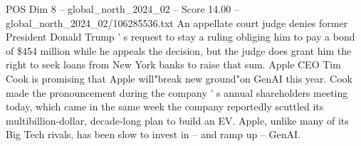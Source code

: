 \begin{textsample}{POS Dim 8 – global\_north\_2024\_02 – Score 14.00 – global\_north\_2024\_02/106285536.txt}
An appellate court judge denies former President Donald Trump ' s request to stay a ruling obliging him to pay a bond of \$454 million while he appeals the decision, but the judge does grant him the right to seek loans from New York banks to raise that sum.
Apple CEO Tim Cook is promising that Apple will"break new ground"on GenAI this year.
Cook made the pronouncement during the company ' s annual shareholders meeting today, which came in the same week the company reportedly scuttled its multibillion-dollar, decade-long plan to build an EV.
Apple, unlike many of its Big Tech rivals, has been slow to invest in -- and ramp up -- GenAI.

\end{textsample}
